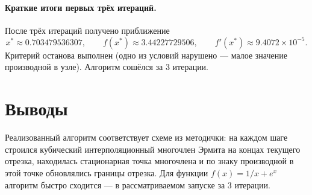 \documentclass[a4paper,12pt]{article}
\begin{document}
\paragraph{Краткие итоги первых трёх итераций.}
После трёх итераций получено приближение
\[ x^* \approx 0.703479536307, \qquad f(x^*) \approx 3.44227729506, \qquad f'(x^*) \approx 9.4072\times10^{-5}.\]
Критерий останова выполнен (одно из условий нарушено — малое значение производной в узле). Алгоритм сошёлся за 3 итерации.

\section*{Выводы}
Реализованный алгоритм соответствует схеме из методички: на каждом шаге строился кубический интерполяционный многочлен Эрмита на концах текущего отрезка, находилась стационарная точка многочлена и по знаку производной в этой точке обновлялись границы отрезка. Для функции $f(x)=1/x+e^{x}$ алгоритм быстро сходится — в рассматриваемом запуске за 3 итерации.
\end{document}
